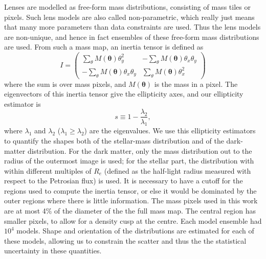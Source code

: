 \documentclass[useAMS,usenatbib]{mn2e}
\begin{document}
Lenses are modelled as free-form mass distributions, consisting of mass tiles or pixels. Such lens models are also called non-parametric, which really just means that many more parameters than data constraints are used. Thus the lens models are non-unique, and hence in fact ensembles of these free-form mass distributions are used. From such a mass map, an inertia tensor is defined as
\begin{equation}\label{eq:inertiatensor}
I = 
\begin{pmatrix}
 \sum_\theta M(\boldsymbol{\theta})\theta^{2}_{y} & -\sum_\theta M(\boldsymbol{\theta})\theta_{x}\theta_{y} \\
-\sum_\theta M(\boldsymbol{\theta})\theta_{x}\theta_{y} & \sum_\theta M(\boldsymbol{\theta})\theta^{2}_{x}
\end{pmatrix}
\end{equation}
where the sum is over mass pixels, and $M(\boldsymbol{\theta})$ is the mass in a pixel. The eigenvectors of this inertia tensor give the ellipticity axes, and our ellipticity estimator is
\begin{equation}\label{eq:shapeestimate}
    s \equiv 1 - \frac{\lambda_{2}}{\lambda_{1}},
\end{equation}
where $\lambda_{1}$ and $\lambda_{2}$ ($\lambda_{1} \geq \lambda_{2}$) are the eigenvalues. We use this ellipticity estimators to quantify the shapes both of the stellar-mass distribution and of the dark-matter distribution. For the dark matter, only the mass distribution out to the radius of the outermost image is used; for the stellar part, the distribution with within different multiples of $R_e$ (defined as the half-light radius measured with respect to the Petrosian flux) is used. It is necessary to have a cutoff for the regions used to compute the inertia tensor, or else it would be dominated by the outer regions where there is little information. The mass pixels used in this work are at most 4\% of the diameter of the the full mass map. The central region has smaller pixels, to allow for a density cusp at the centre. Each model ensemble had $10^4$ models. Shape and orientation of the distributions are estimated for each of these models, allowing us to constrain the scatter and thus the the statistical uncertainty in these quantities.
\end{document}
